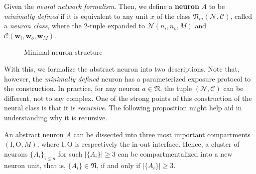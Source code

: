 \begin{definition} \label{def:neuclass}
    Given the \textit{neural network formalism}. Then, we define a \textbf{neuron} $A$ to be \textit{minimally defined} if it is equivalent to any unit $x$ of the class $\mathfrak{N}_{m}(\mathcal{N}, \mathcal{C})$, called a \textit{neuron class}, where the 2-tuple expanded to $\mathcal{N}(n_{i}, n_{o}, M)$ and $\mathcal{C}(\mathbf{w}_{i}, \mathbf{w}_{o}, \mathbf{w}_{M})$. %
\end{definition}

\begin{figure}[!ht]
    \centering
    \caption{Minimal neuron structure}
    \label{fig:lable}
\end{figure}

With this, we formalize the abstract neuron into two descriptions. Note that, however, the \textit{minimally defined} neuron has a parameterized exposure protocol to the construction. In practice, for any neuron $a \in \mathfrak{N}$, the tuple $(\mathcal{N}, \mathcal{C})$ can be different, not to say complex. One of the strong points of this construction of the neural class is that it is \textit{recursive}. The following proposition might help aid in understanding why it is recursive.

\begin{proposition}
    An abstract neuron $A$  can be dissected into three most important compartments $(\mathrm{I},\mathrm{O},M)$, where $\mathrm{I},\mathrm{O}$ is respectively the in-out interface. Hence, a cluster of neurons $\{A_{i}\}_{i \leq n}$ for such $\lvert \{ A_{i} \} \rvert \geq 3$ can be compartmentalized into a new neuron unit, that is, $\{ A_{i} \}\in \mathfrak{N}$, if and only if $\lvert \{ A_{i} \} \rvert \geq 3$. 
\end{proposition}

